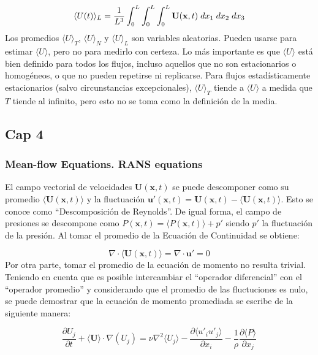$$\langle U(t) \rangle_L = \frac{1}{L^3} \int_0^{L} \int_0^{L} \int_0^{L} \mathbf{U}(\mathbf{x},t) \hspace*{1mm} dx_1 \hspace*{1mm} dx_2 \hspace*{1mm} dx_3$$
Los promedios $\langle U \rangle_T$, $\langle U \rangle_N$ y $\langle U \rangle_L$ son variables aleatorias. Pueden usarse para estimar $ \langle U \rangle$, pero no para medirlo con certeza. Lo más importante es que  $\langle U \rangle$ está bien definido para todos los flujos, incluso aquellos que no son estacionarios o homogéneos, o que no pueden repetirse ni replicarse. Para flujos estadísticamente estacionarios (salvo circunstancias excepcionales), $\langle U \rangle_T$ tiende a $\langle U \rangle$ a medida que $T$ tiende al infinito, pero esto no se toma como la definición de la media.

\subsection{Cap 4}

\subsubsection{Mean-flow Equations. RANS equations}

El campo vectorial de velocidades $\mathbf{U}(\mathbf{x},t)$ se puede descomponer como su promedio $ \langle \mathbf{U}(\mathbf{x},t) \rangle$ y la fluctuación $\mathbf{u'}(\mathbf{x},t) = \mathbf{U}(\mathbf{x},t) -  \langle \mathbf{U}(\mathbf{x},t) \rangle$. Esto se conoce como ``Descomposición de Reynolds''. De igual forma, el campo de presiones se descompone como $P(\mathbf{x},t) = \langle P(\mathbf{x},t) \rangle + p'$ siendo $p'$ la fluctuación de la presión. Al tomar el promedio de la Ecuación de Continuidad se obtiene:

$$\nabla \cdot \langle \mathbf{U}(\mathbf{x},t) \rangle = \nabla \cdot \mathbf{u'} = 0$$ 
Por otra parte, tomar el promedio de la ecuación de momento no resulta trivial. Teniendo en cuenta que es posible intercambiar el ``operador diferencial'' con el ``operador promedio'' y considerando que el promedio de las fluctuciones es nulo, se puede demostrar que la ecuación de momento promediada se escribe de la siguiente manera:

$$\frac{\partial U_j }{\partial t} + \langle \mathbf{U} \rangle \cdot \nabla (U_j) = \nu \nabla^2 \langle U_j \rangle - \frac{\partial \langle u'_i u'_j \rangle}{\partial x_i} - \frac{1}{\rho} \frac{\partial \langle P \rangle}{\partial x_j}$$

